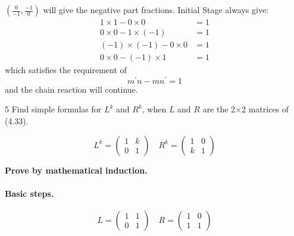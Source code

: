 \documentclass[a4paper,12pt]{article}
\makeatletter
\newtheorem*{solution}{Solution}
\theoremstyle{definition}
\renewenvironment{solution}[1][Solution] {\par\pushQED{\qed}\normalfont\topsep6\p@\@plus6\p@\relax\trivlist\item[\hskip\labelsep\bfseries#1\@addpunct{.}]\ignorespaces}{\popQED\endtrivlist\@endpefalse} \makeatother
\newenvironment{problems}{\begin{list}{}{\renewcommand{\makelabel}[1]{\textbf{##1}\hfil}}}{\end{list}}
\makeatother
\begin{document}
\begin{problems}
\begin{solution}
        $\left(\frac{0}{-1},\frac{-1}{0}\right)$ will give the negative part fractions. Initial Stage always give:
        \begin{align*}
            1\times 1 - 0 \times 0 &= 1\\
            0\times 0 - 1 \times (-1) &= 1\\
            (-1)\times (-1) - 0 \times 0 &= 1 \\
            0\times 0 - (-1)\times 1 &= 1
        \end{align*}
        which satisfies the requirement of 
        \begin{equation*}
            m^\prime n - mn^\prime = 1
        \end{equation*}
        and the chain reaction will continue.
    \end{solution} 
    \item[5] Find simple formulas for $L^k$ and $R^k$, when $L$ and $R$ are the 2$\times$2 matrices of (4.33).
    \begin{solution}
        \begin{equation*}
            L^k=\begin{pmatrix}
                1 & k\\
                0 & 1
            \end{pmatrix}\quad
            R^k=\begin{pmatrix}
                1 & 0\\
                k & 1
            \end{pmatrix}
        \end{equation*}
        
        \textbf{Prove by mathematical induction.}
        \paragraph{Basic steps.}
        \begin{equation*}
            L=\begin{pmatrix}
                1 & 1\\
                0 & 1
            \end{pmatrix}\quad
            R=\begin{pmatrix}
                1 & 0\\
                1 & 1
            \end{pmatrix}
        \end{equation*}


\end{solution}
\end{problems}
\end{document}
